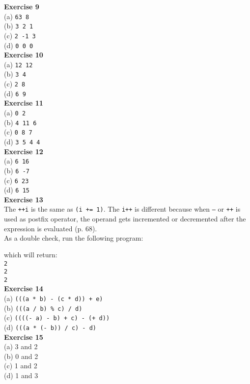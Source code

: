 \documentclass[a4paper, 10pt]{article}
\begin{document}
\textbf{Exercise 9} \\
(a) \texttt{63 8} \\
(b) \texttt{3 2 1} \\
(c) \texttt{2 -1 3} \\
(d) \texttt{0 0 0} \\

\textbf{Exercise 10} \\
(a) \texttt{12 12} \\
(b) \texttt{3 4} \\
(c) \texttt{2 8} \\
(d) \texttt{6 9} \\

\textbf{Exercise 11} \\
(a) \texttt{0 2} \\
(b) \texttt{4 11 6} \\
(c) \texttt{0 8 7} \\
(d) \texttt{3 5 4 4} \\

\textbf{Exercise 12} \\
(a) \texttt{6 16} \\
(b) \texttt{6 -7} \\
(c) \texttt{6 23} \\
(d) \texttt{6 15} \\ 

\textbf{Exercise 13} \\
The \texttt{++i} is the same as \texttt{(i += 1)}. The \texttt{i++} is different because when \texttt{--} or \texttt{++} is used as postfix operator, the operand gets incremented or decremented after the expression is evaluated (p. 68). \\

As a double check, run the following program:

which will return: \\
\texttt{2 \\ 2 \\ 2} \\

\textbf{Exercise 14} \\
(a) \texttt{(((a * b) - (c * d)) + e)} \\
(b) \texttt{(((a / b) \% c) / d)} \\
(c) \texttt{((((- a) - b) + c) - (+ d))} \\
(d) \texttt{(((a * (- b)) / c) - d)} \\

\textbf{Exercise 15} \\
(a) 3 and 2 \\
(b) 0 and 2 \\
(c) 1 and 2 \\
(d) 1 and 3 \\
\end{document}
